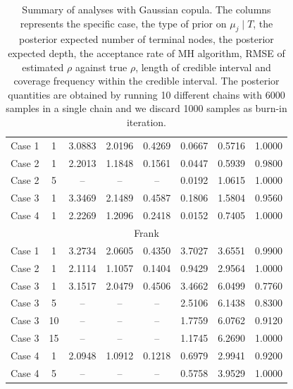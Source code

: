 \documentclass{amsart}
\begin{document}
\begin{table}[ht]
{\begin{tabular}{lc|cccccc}
		\midrule
		Case 1 & 1 & 3.0883 & 2.0196 & 0.4269 & 0.0667 & 0.5716 & 1.0000 \\ 
		Case 2 & 1 & 2.2013 & 1.1848 & 0.1561 & 0.0447 & 0.5939 & 0.9800 \\ 
		Case 2 & 5 & -- & -- & -- & 0.0192 & 1.0615 & 1.0000 \\ 
		Case 3 & 1 & 3.3469 & 2.1489 & 0.4587 & 0.1806 & 1.5804 & 0.9560 \\ 
		Case 4 & 1 & 2.2269 & 1.2096 & 0.2418 & 0.0152 & 0.7405 & 1.0000 \\ 
		\midrule
		\multicolumn{8}{c}{Frank} \\
		\midrule
		Case 1 & 1 & 3.2734 & 2.0605 & 0.4350 & 3.7027 & 3.6551 & 0.9900 \\ 
		Case 2 & 1 & 2.1114 & 1.1057 & 0.1404 & 0.9429 & 2.9564 & 1.0000 \\ 
		Case 3 & 1 & 3.1517 & 2.0479 & 0.4506 & 3.4662 & 6.0499 & 0.7760 \\ 
		Case 3 & 5 & -- & -- & -- & 2.5106 & 6.1438 & 0.8300 \\ 
		Case 3 & 10 & -- & -- & -- & 1.7759 & 6.0762 & 0.9120 \\ 
		Case 3 & 15 & -- & -- & -- & 1.1745 & 6.2690 & 1.0000 \\ 
		Case 4 & 1 & 2.0948 & 1.0912 & 0.1218 & 0.6979 & 2.9941 & 0.9200 \\ 
		Case 4 & 5 & -- & -- & -- & 0.5758 & 3.9529 & 1.0000 \\ 
		\bottomrule
		\end{tabular}}
	\caption{Summary of analyses with Gaussian copula. The columns represents the specific case, the type of prior on $\mu_j\mid T$, the posterior expected number of terminal nodes, the posterior expected depth, the acceptance rate of MH algorithm, RMSE of estimated $\rho$ against true $\rho$, length of credible interval and coverage frequency within the credible interval. The posterior quantities are obtained by running 10 different chains with 6000 samples in a single chain and we discard 1000 samples as burn-in iteration.}
	\label{tab:gauss:summary}
\end{table}
\end{document}
